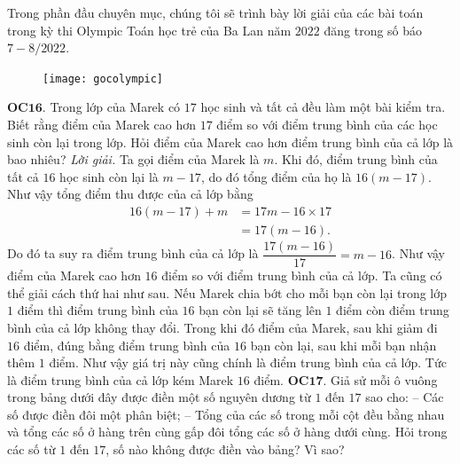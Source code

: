 \begin{multicols}{2}
	Trong phần đầu chuyên mục, chúng tôi sẽ trình bày lời giải của các bài toán trong kỳ thi Olympic Toán học trẻ của Ba Lan năm $2022$  đăng trong số báo $7-8/2022$. 
	\begin{figure}[H]
		\centering
		\vspace*{-5pt}
		\captionsetup{labelformat= empty, justification=centering}
		\texttt{[image: gocolympic]}
		\vspace*{-10pt}
	\end{figure}
	{\bf\color{cackithi} OC$\pmb{16.}$}  Trong lớp của Marek có $17$ học sinh và tất cả đều làm một bài kiểm tra. Biết rằng điểm của Marek cao hơn $17$ điểm so với điểm trung bình của các học sinh còn lại trong lớp. Hỏi điểm của Marek cao hơn điểm trung bình của cả lớp là bao nhiêu?
	\vskip 0.1cm
	\textit{Lời giải.} Ta gọi điểm của Marek là $m$. Khi đó, điểm trung bình  của tất cả  $16$ học sinh còn lại là $m - 17$, do đó tổng điểm của họ là $16(m - 17)$. Như vậy tổng điểm thu được của cả lớp bằng
	\begin{align*}
		16(m - 17) + m& =  17m - 16\times 17 \\
		&= 17(m - 16).
	\end{align*}
	Do đó ta suy ra điểm trung bình của cả lớp là $\dfrac{17(m - 16)}{17}= m - 16$. Như vậy điểm của Marek cao hơn $16$ điểm so với điểm trung bình của cả lớp. 
	\vskip 0.1cm
	Ta cũng có thể giải cách thứ hai như sau. Nếu Marek chia bớt cho mỗi bạn còn lại trong lớp $1$ điểm thì điểm trung bình của $16$ bạn còn lại sẽ tăng lên $1$ điểm còn điểm trung bình của cả lớp không thay đổi. Trong khi đó điểm của Marek, sau khi giảm đi $16$ điểm,  đúng bằng điểm trung bình của $16$ bạn còn lại, sau khi mỗi bạn nhận thêm $1$ điểm. Như vậy giá trị này cũng chính là điểm trung bình của cả lớp. Tức là điểm trung bình của cả lớp kém Marek $16$ điểm.    
	\vskip 0.1cm
	{\bf\color{cackithi} OC$\pmb{17.}$} Giả sử mỗi ô vuông trong bảng dưới đây được điền một số nguyên dương từ $1$ đến $17$ sao cho:
	\vskip 0.1cm
	-- Các số được điền đôi một phân biệt;
	\vskip 0.1cm
	-- Tổng của các số trong mỗi cột đều bằng nhau và tổng các số ở hàng trên cùng gấp đôi tổng các số ở hàng dưới cùng.
	\vskip 0.1cm
	Hỏi trong các số từ $1$ đến $17$, số nào không được điền vào bảng? Vì sao?
	\begin{figure}[H]
		\vspace*{-5pt}
		\centering

\end{figure}
\end{multicols}
